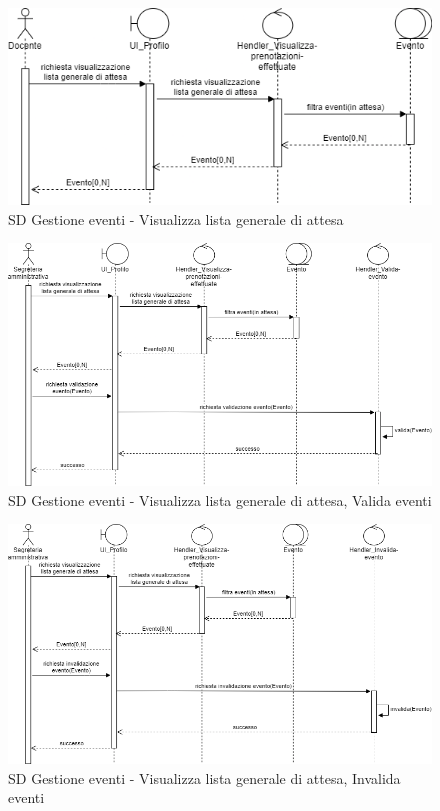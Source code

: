 \documentclass[11pt]{article}
\begin{document}
\begin{figure}[H]
\centering
\includegraphics[width=1\textwidth]{SD Gestione eventi - Visualizza lista generale di attesa.png}
\caption{SD Gestione eventi - Visualizza lista generale di attesa}
\end{figure}

\begin{figure}[H]
\centering
\includegraphics[width=1\textwidth]{SD Gestione eventi - Visualizza lista generale di attesa, Valida evento.png}
\caption{SD Gestione eventi - Visualizza lista generale di attesa, Valida eventi}
\end{figure}

\begin{figure}[H]
\centering
\includegraphics[width=1\textwidth]{SD Gestione eventi - Visualizza lista generale di attesa, Invalida evento.png}
\caption{SD Gestione eventi - Visualizza lista generale di attesa, Invalida eventi}
\end{figure}
\end{document}
